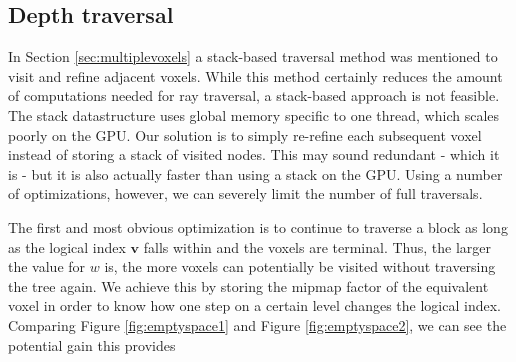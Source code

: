 \subsection{Depth traversal}
%
In Section \ref{sec:multiplevoxels} a stack-based traversal method was mentioned to visit and refine adjacent voxels. While this method certainly reduces the amount of computations needed for ray traversal, a stack-based approach is not feasible. The stack datastructure uses global memory specific to one thread, which scales poorly on the GPU. Our solution is to simply re-refine each subsequent voxel instead of storing a stack of visited nodes. This may sound redundant - which it is - but it is also actually faster than using a stack on the GPU. Using a number of optimizations, however, we can severely limit the number of full traversals.

The first and most obvious optimization is to continue to traverse a block as long as the logical index $\mathbf{v}$ falls within and the voxels are terminal. Thus, the larger the value for $w$ is, the more voxels can potentially be visited without traversing the tree again. We achieve this by storing the mipmap factor of the equivalent voxel in order to know how one step on a certain level changes the logical index. Comparing Figure \ref{fig:emptyspace1} and Figure \ref{fig:emptyspace2}, we can see the potential gain this provides
%
